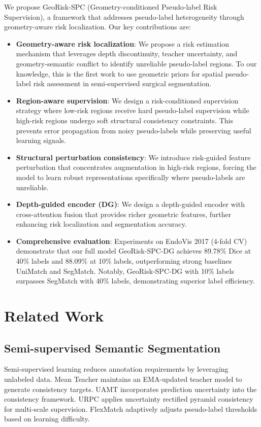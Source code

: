 \documentclass[conference]{IEEEtran}
\begin{document}
We propose GeoRisk-SPC (Geometry-conditioned Pseudo-label Risk Supervision), a framework that addresses pseudo-label heterogeneity through geometry-aware risk localization. Our key contributions are:
\begin{itemize}
\item \textbf{Geometry-aware risk localization}: We propose a risk estimation mechanism that leverages depth discontinuity, teacher uncertainty, and geometry-semantic conflict to identify unreliable pseudo-label regions. To our knowledge, this is the first work to use geometric priors for spatial pseudo-label risk assessment in semi-supervised surgical segmentation.

\item \textbf{Region-aware supervision}: We design a risk-conditioned supervision strategy where low-risk regions receive hard pseudo-label supervision while high-risk regions undergo soft structural consistency constraints. This prevents error propagation from noisy pseudo-labels while preserving useful learning signals.

\item \textbf{Structural perturbation consistency}: We introduce risk-guided feature perturbation that concentrates augmentation in high-risk regions, forcing the model to learn robust representations specifically where pseudo-labels are unreliable.

\item \textbf{Depth-guided encoder (DG)}: We design a depth-guided encoder with cross-attention fusion that provides richer geometric features, further enhancing risk localization and segmentation accuracy.

\item \textbf{Comprehensive evaluation}: Experiments on EndoVis 2017 (4-fold CV) demonstrate that our full model GeoRisk-SPC-DG achieves 89.78\% Dice at 40\% labels and 88.09\% at 10\% labels, outperforming strong baselines UniMatch and SegMatch. Notably, GeoRisk-SPC-DG with 10\% labels surpasses SegMatch with 40\% labels, demonstrating superior label efficiency.
\end{itemize}

\section{Related Work}

\subsection{Semi-supervised Semantic Segmentation}
Semi-supervised learning reduces annotation requirements by leveraging unlabeled data. Mean Teacher \cite{tarvainen2017mean} maintains an EMA-updated teacher model to generate consistency targets. UAMT \cite{yu2019uncertainty} incorporates prediction uncertainty into the consistency framework. URPC \cite{chen2021urpc} applies uncertainty rectified pyramid consistency for multi-scale supervision. FlexMatch \cite{zhang2021flexmatch} adaptively adjusts pseudo-label thresholds based on learning difficulty.
\end{document}
